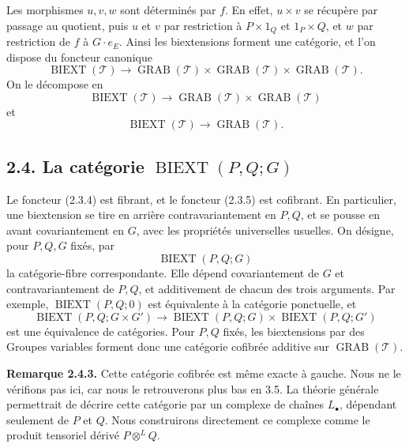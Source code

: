 \documentclass[11pt]{article}
\providecommand{\BIEXT}{\operatorname{BIEXT}}
\providecommand{\GRAB}{\operatorname{GRAB}}
\begin{document}
Les morphismes \(u,v,w\) sont déterminés par \(f\).  En effet, \(u\times v\) se récupère par passage au quotient, puis \(u\) et \(v\) par restriction à \(P\times1_Q\) et \(1_P\times Q\), et \(w\) par restriction de \(f\) à \(G\cdot e_E\).  Ainsi les biextensions forment une catégorie, et l'on dispose du foncteur canonique
\begin{equation}\tag{2.3.3}
  \BIEXT(\mathcal T)\longrightarrow\GRAB(\mathcal T)\times\GRAB(\mathcal T)\times\GRAB(\mathcal T).
\end{equation}
On le décompose en
\begin{equation}\tag{2.3.4}
  \BIEXT(\mathcal T)\longrightarrow\GRAB(\mathcal T)\times\GRAB(\mathcal T)
\end{equation}
et
\begin{equation}\tag{2.3.5}
  \BIEXT(\mathcal T)\longrightarrow\GRAB(\mathcal T).
\end{equation}

\subsection*{2.4. La catégorie \(\BIEXT(P,Q;G)\)}
Le foncteur (2.3.4) est fibrant, et le foncteur (2.3.5) est cofibrant.  En particulier, une biextension se tire en arrière contravariantement en \(P,Q\), et se pousse en avant covariantement en \(G\), avec les propriétés universelles usuelles.  On désigne, pour \(P,Q,G\) fixés, par
\begin{equation}\tag{2.4.1}
  \BIEXT(P,Q;G)
\end{equation}
la catégorie-fibre correspondante.  Elle dépend covariantement de \(G\) et contravariantement de \(P,Q\), et additivement de chacun des trois arguments.  Par exemple, \(\BIEXT(P,Q;0)\) est équivalente à la catégorie ponctuelle, et
\begin{equation}\tag{2.4.2}
  \BIEXT(P,Q;G\times G')\longrightarrow
  \BIEXT(P,Q;G)\times\BIEXT(P,Q;G')
\end{equation}
est une équivalence de catégories.  Pour \(P,Q\) fixés, les biextensions par des Groupes variables forment donc une catégorie cofibrée additive sur \(\GRAB(\mathcal T)\).

\textbf{Remarque 2.4.3.}  Cette catégorie cofibrée est même exacte à gauche.  Nous ne le vérifions pas ici, car nous le retrouverons plus bas en 3.5.  La théorie générale permettrait de décrire cette catégorie par un complexe de chaînes \(L_\bullet\), dépendant seulement de \(P\) et \(Q\).  Nous construirons directement ce complexe comme le produit tensoriel dérivé \(P\otimes^L Q\).
\end{document}
